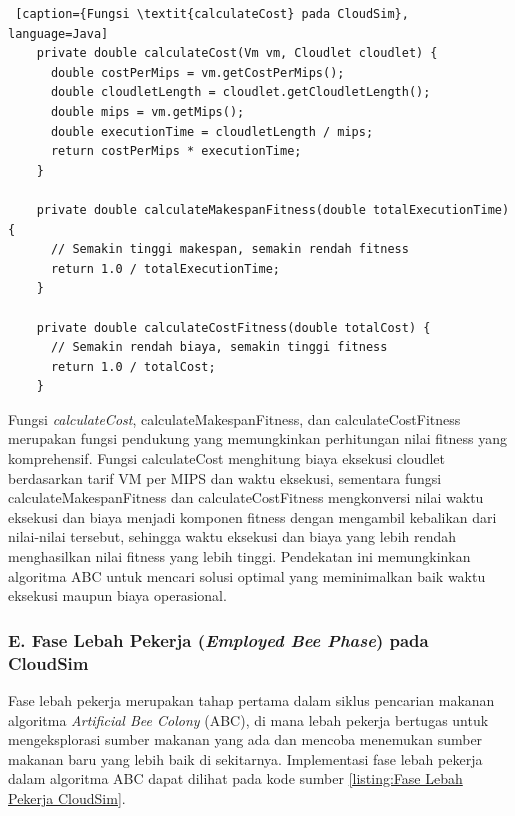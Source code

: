 \begin{lstlisting} [caption={Fungsi \textit{calculateCost} pada CloudSim}, language=Java]
    private double calculateCost(Vm vm, Cloudlet cloudlet) {
      double costPerMips = vm.getCostPerMips();
      double cloudletLength = cloudlet.getCloudletLength();
      double mips = vm.getMips();
      double executionTime = cloudletLength / mips;
      return costPerMips * executionTime;
    }

    private double calculateMakespanFitness(double totalExecutionTime) {
      // Semakin tinggi makespan, semakin rendah fitness
      return 1.0 / totalExecutionTime;
    }

    private double calculateCostFitness(double totalCost) {
      // Semakin rendah biaya, semakin tinggi fitness
      return 1.0 / totalCost;
    }
\end{lstlisting}

Fungsi \textit{calculateCost}, calculateMakespanFitness, dan calculateCostFitness merupakan fungsi pendukung yang memungkinkan perhitungan nilai fitness yang komprehensif. Fungsi calculateCost menghitung biaya eksekusi cloudlet berdasarkan tarif VM per MIPS dan waktu eksekusi, sementara fungsi calculateMakespanFitness dan calculateCostFitness mengkonversi nilai waktu eksekusi dan biaya menjadi komponen fitness dengan mengambil kebalikan dari nilai-nilai tersebut, sehingga waktu eksekusi dan biaya yang lebih rendah menghasilkan nilai fitness yang lebih tinggi. Pendekatan ini memungkinkan algoritma ABC untuk mencari solusi optimal yang meminimalkan baik waktu eksekusi maupun biaya operasional.

\subsubsection{E. Fase Lebah Pekerja (\textit{Employed Bee Phase}) pada CloudSim}
Fase lebah pekerja merupakan tahap pertama dalam siklus pencarian makanan algoritma \textit{Artificial Bee Colony} (ABC), di mana lebah pekerja bertugas untuk mengeksplorasi sumber makanan yang ada dan mencoba menemukan sumber makanan baru yang lebih baik di sekitarnya. Implementasi fase lebah pekerja dalam algoritma ABC dapat dilihat pada kode sumber \ref{listing:Fase Lebah Pekerja CloudSim}.

